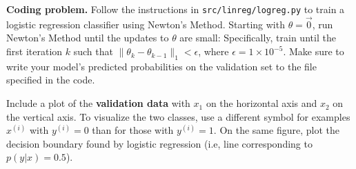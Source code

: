 \item {} \textbf{Coding problem.}
Follow the instructions in \texttt{src/linreg/logreg.py} to train a
logistic regression classifier using Newton's Method.
Starting with $\theta = \vec{0}$, run Newton's Method until the updates to
$\theta$ are small: Specifically,  train until the first iteration $k$ such
that $\|\theta_{k} - \theta_{k-1}\|_1 < \epsilon$, where
$\epsilon = 1\times 10^{-5}$. Make sure to write your model's predicted probabilities on
the validation set to the file specified in the code.

Include a plot of the \textbf{validation data} with $x_1$ on the horizontal axis and $x_2$ on the vertical axis.
To visualize the two classes, use a different symbol for examples $x^{(i)}$
with $y^{(i)} = 0$ than for those with $y^{(i)} = 1$. On the same figure, plot the decision boundary
found by logistic regression (i.e, line corresponding to $p(y|x) = 0.5$).


